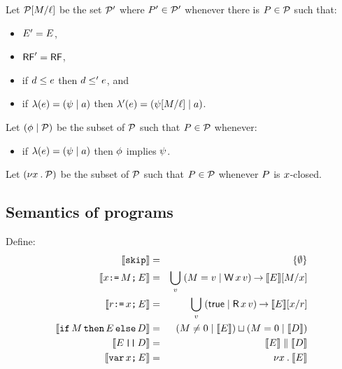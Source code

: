 Let $\mathcal{P}[M/\ell]$ be the set $\mathcal{P}'$ where $P'\in\mathcal{P}'$ whenever
there is $P\in\mathcal{P}$ such that:
\begin{itemize}
\item $E' = E$,
\item $\mathsf{RF}' = \mathsf{RF}$,
\item if $d \le e$ then $d \le' e$, and
\item if $\lambda(e) = (\psi \mid a)$ then $\lambda'(e) = (\psi[M/\ell] \mid a)$.
\end{itemize}
Let $(\phi \mid \mathcal{P})$ be the subset of $\mathcal{P}$ such that $P\in\mathcal{P}$ whenever:
\begin{itemize}
\item if $\lambda(e) = (\psi \mid a)$ then $\phi$ implies $\psi$.
\end{itemize}
Let $(\nu x\mathbin.\mathcal{P})$ be the subset of $\mathcal{P}$ such that $P\in\mathcal{P}$ whenever
$P$ is $x$-closed.

\subsection{Semantics of programs}

Define:
\begin{eqnarray*}
  \llbracket\texttt{skip}\rrbracket & = & \{ \emptyset \} \\
  \llbracket x\texttt{:=}\,M\texttt{;}\, E\rrbracket & = & \bigcup_v\; (M=v \mid \mathsf{W}\,x\,v) \mathbin\rightarrow \llbracket E\rrbracket[M/x] \\
  \llbracket r\texttt{:=}\,x\texttt{;}\, E\rrbracket & = & \bigcup_v\; (\mathsf{true} \mid \mathsf{R}\,x\,v) \mathbin\rightarrow \llbracket E\rrbracket[x/r] \\
  \llbracket\texttt{if}\, M \,\texttt{then}\, E \,\texttt{else}\, D\rrbracket & = & (M \neq 0 \mid \llbracket E\rrbracket) \sqcup (M=0 \mid \llbracket D\rrbracket) \\
  \llbracket E \,\texttt{||}\, D\rrbracket & = & \llbracket E\rrbracket \parallel \llbracket D\rrbracket \\
  \llbracket\texttt{var}\,x\texttt{;}\, E\rrbracket & = & \nu x \mathbin. \llbracket E\rrbracket
\end{eqnarray*}
